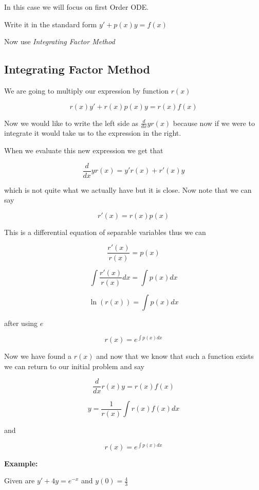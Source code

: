 In this case we will focus on first Order ODE\@.
\vspace{\baselineskip}

Write it in the standard form \(y' + p(x)y = f(x)\)
\vspace{\baselineskip}

Now use \emph{Integrating Factor Method}

\subsection{Integrating Factor Method}

We are going to multiply our expression by function \(r(x)\) 

\[r(x)y' + r(x)p(x)y = r(x)f(x)\]

Now we would like to write the left side as \(\frac{d}{dx} y r(x)\) because now if we
were to integrate it would take us to the expression in the right.
\vspace{\baselineskip}

When we evaluate this new expression we get that

\[\frac{d}{dx} y r(x) = y'r(x) + r'(x)y\]

which is not quite what we actually have but it is close. Now note that we can say

\[r'(x) = r(x)p(x)\]

This is a differential equation of separable variables thus we can

\[\frac{r'(x)}{r(x)} = p(x)\]

\[\int \frac{r'(x)}{r(x)}dx = \int p(x)dx\]

\[ \ln(r(x)) = \int p(x) dx\]

after using \(e\)

\[ r(x) = e^{\int p(x) dx}\]

Now we have found a \(r(x)\) and now that we know that such a function exists we can return 
to our initial problem and say

\[\frac{d}{dx}r(x)y = r(x)f(x)\]

\[
y = \frac{1}{r (x) } \int r (x) f (x) dx
\]

and 

\[r(x) = e^{\int p (x) dx}\]

\textbf{Example:}
\vspace{\baselineskip}


Given are \(y' + 4y = e^{-x}\) and \(y(0) = \frac{4}{3}\)
\vspace{\baselineskip}

